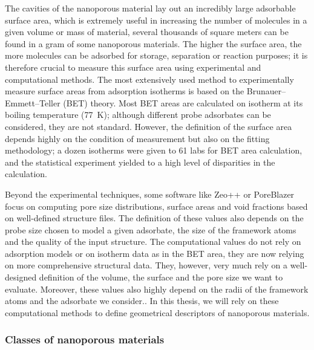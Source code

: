 \documentclass[main.tex]{subfiles}
\begin{document}
The cavities of the nanoporous material lay out an incredibly large adsorbable surface area, which is extremely useful in increasing the number of molecules in a given volume or mass of material, several thousands of square meters can be found in a gram of some nanoporous materials.\autocite{Farha_2012} The higher the surface area, the more molecules can be adsorbed for storage, separation or reaction purposes; it is therefore crucial to measure this surface area using experimental and computational methods. The most extensively used method to experimentally measure surface areas from adsorption isotherms is based on the Brunauer–Emmett–Teller (BET) theory.\autocite{Detsi_2011} Most BET areas are calculated on  isotherm at its boiling temperature (\SI{77}{\kelvin}); although different probe adsorbates can be considered, they are not standard.\autocite{Tian_2017} However, the definition of the surface area depends highly on the condition of measurement but also on the fitting methodology; a dozen isotherms were given to 61 labs for BET area calculation, and the statistical experiment yielded to a high level of disparities in the calculation.\autocite{Osterrieth_2022} 

Beyond the experimental techniques, some software like Zeo++ or PoreBlazer focus on computing pore size distributions, surface areas and void fractions based on well-defined structure files.\autocite{Zeo++,PoreBlazer} The definition of these values also depends on the probe size chosen to model a given adsorbate, the size of the framework atoms and the quality of the input structure. The computational values do not rely on adsorption models or on isotherm data as in the BET area, they are now relying on more comprehensive structural data. They, however, very much rely on a well-designed definition of the volume, the surface and the pore size we want to evaluate. Moreover, these values also highly depend on the radii of the framework atoms and the adsorbate we consider.\autocite{Hung_2021}. In this thesis, we will rely on these computational methods to define geometrical descriptors of nanoporous materials.

\subsubsection{Classes of nanoporous materials}
\end{document}
